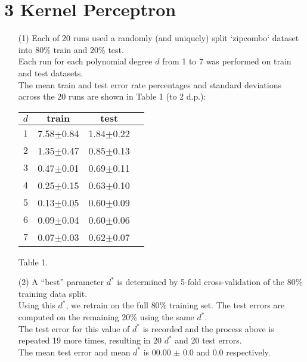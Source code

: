 \documentclass[a4paper,12pt]{article}
\begin{document}
\section*{3 Kernel Perceptron}
\begin{enumerate}

\item[(1)] 
Each of 20 runs used a randomly (and uniquely) split `zipcombo` dataset into $80\%$ train and $20\%$ test. \\
Each run for each polynomial degree $d$ from 1 to 7 was performed on train and test datasets.\\
The mean train and test error rate percentages and standard deviations across the 20 runs are shown in Table 1 (to 2 d.p.):

\begin{tabular}{|c|c|c|c|}
\hline
$d$&$\textbf{train}$&$\textbf{test}$\\
\hline
$1$&7.58$\pm$0.84&1.84$\pm$0.22\\
\hline
$2$&1.35$\pm$0.47&0.85$\pm$0.13\\
\hline
$3$&0.47$\pm$0.01&0.69$\pm$0.11\\
\hline
$4$&0.25$\pm$0.15&0.63$\pm$0.10\\
\hline
$5$&0.13$\pm$0.05&0.60$\pm$0.09\\
\hline
$6$&0.09$\pm$0.04&0.60$\pm$0.06\\
\hline
$7$&0.07$\pm$0.03&0.62$\pm$0.07\\
\hline
\end{tabular}\par 
Table 1.

\item[(2)] 
A “best” parameter $d^*$ is determined by 5-fold cross-validation of the $80\%$ training data split. \\
Using this $d^*$, we retrain on the full $80\%$ training set. The test errors are computed on the remaining $20\%$ using the same $d^*$. \\
The test error for this value of $d^*$ is recorded and the process above is repeated 19 more times, resulting in 20 $d^*$ and 20 test errors.\\
The mean test error and mean $d^*$ is 00.00 $\pm$ 0.0 and 0.0 respectively.

\end{enumerate}
\clearpage
\end{document}
